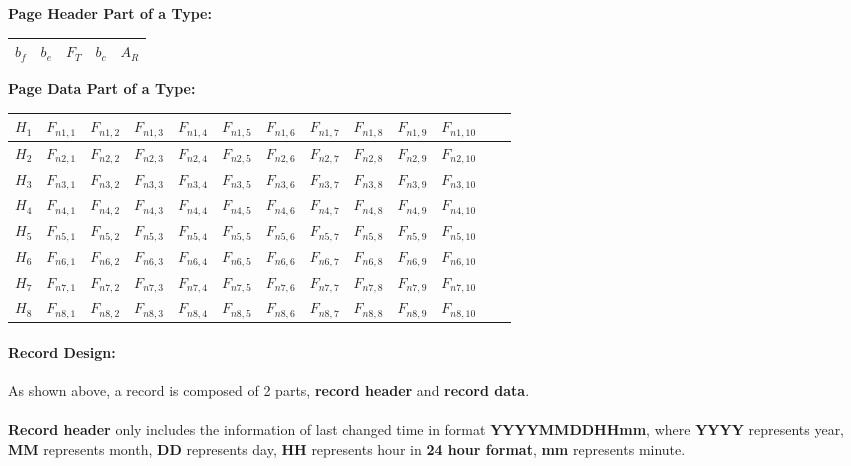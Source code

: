 \documentclass[12pt]{report}
\begin{document}
\vspace{1cm}

\hspace{3.2cm}\textbf{Page Header Part of a Type:} 
{
\begin{center}
\begin{tabular}{|l|l|l|l|l|}
\hline
${b}_{f}$ & ${b}_{e}$ & ${F}_{T}$ & ${b}_{c}$ & ${A}_{R}$ \\
\hline
\end{tabular}
\end{center}
}

\vspace{2cm}

\hspace{3.4cm}\textbf{Page Data Part of a Type:} 
{
\begin{center}
\begin{tabular}{|l|l|l|l|l|l|l|l|l|l|l|l|l|}
\hline
 $H_{1}$ & $F_{n1,1}$ & $F_{n1,2}$ & $F_{n1,3}$ & $F_{n1,4}$ & $F_{n1,5}$ & $F_{n1,6}$ & $F_{n1,7}$ & $F_{n1,8}$ & $F_{n1,9}$ & $F_{n{1,10}}$ \\
\hline
 $H_{2}$ & $F_{n2,1}$ & $F_{n2,2}$ & $F_{n2,3}$ & $F_{n2,4}$ & $F_{n2,5}$ & $F_{n2,6}$ & $F_{n2,7}$ & $F_{n2,8}$ & $F_{n2,9}$ & $F_{n{2,10}}$ \\
\hline
 $H_{3}$ & $F_{n3,1}$ & $F_{n3,2}$ & $F_{n3,3}$ & $F_{n3,4}$ & $F_{n3,5}$ & $F_{n3,6}$ & $F_{n3,7}$ & $F_{n3,8}$ & $F_{n3,9}$ & $F_{n{3,10}}$ \\
\hline
 $H_{4}$ & $F_{n4,1}$ & $F_{n4,2}$ & $F_{n4,3}$ & $F_{n4,4}$ & $F_{n4,5}$ & $F_{n4,6}$ & $F_{n4,7}$ & $F_{n4,8}$ & $F_{n4,9}$ & $F_{n{4,10}}$ \\
\hline
 $H_{5}$ & $F_{n5,1}$ & $F_{n5,2}$ & $F_{n5,3}$ & $F_{n5,4}$ & $F_{n5,5}$ & $F_{n5,6}$ & $F_{n5,7}$ & $F_{n5,8}$ & $F_{n5,9}$ & $F_{n{5,10}}$ \\
\hline
 $H_{6}$ & $F_{n6,1}$ & $F_{n6,2}$ & $F_{n6,3}$ & $F_{n6,4}$ & $F_{n6,5}$ & $F_{n6,6}$ & $F_{n6,7}$ & $F_{n6,8}$ & $F_{n6,9}$ & $F_{n{6,10}}$ \\
\hline
 $H_{7}$ & $F_{n7,1}$ & $F_{n7,2}$ & $F_{n7,3}$ & $F_{n7,4}$ & $F_{n7,5}$ & $F_{n7,6}$ & $F_{n7,7}$ & $F_{n7,8}$ & $F_{n7,9}$ & $F_{n{7,10}}$ \\
\hline
 $H_{8}$ & $F_{n8,1}$ & $F_{n8,2}$ & $F_{n8,3}$ & $F_{n8,4}$ & $F_{n8,5}$ & $F_{n8,6}$ & $F_{n8,7}$ & $F_{n8,8}$ & $F_{n8,9}$ & $F_{n{8,10}}$ \\
\hline
\end{tabular}
\end{center}
}

\paragraph{Record Design:}
As shown above, a record is composed of 2 parts, \textbf{record header} and \textbf{record data}. \\\\
\textbf{Record header} only includes the information of last changed time in format {\large \textbf{YYYYMMDDHHmm}}, where \textbf{YYYY} represents year, \textbf{MM} represents month, \textbf{DD} represents day, \textbf{HH} represents hour in \textbf{24 hour format}, \textbf{mm} represents minute.
\end{document}
